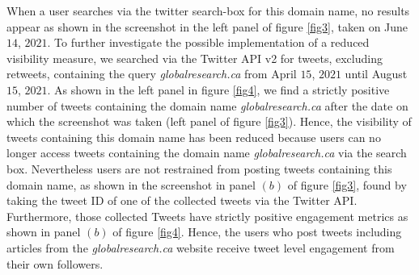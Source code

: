 \documentclass{article}
\begin{document}
When a user searches via the twitter search-box for this domain name, no results appear as shown in the screenshot in the left panel of figure \ref{fig3}, taken on June $14$, $2021$. To further investigate the possible implementation of a reduced visibility measure, we searched via the Twitter API v2 for tweets, excluding retweets, containing the query {\it globalresearch.ca} from April $15$, $2021$ until August $15$, $2021$.  As shown in the left panel in figure \ref{fig4}, we find a strictly positive number of tweets containing the domain name {\it globalresearch.ca} after the date on which the screenshot was taken (left panel of figure \ref{fig3}). Hence, the visibility of tweets containing this domain name has been reduced because users can no longer access tweets containing the domain name {\it globalresearch.ca} via the search box. Nevertheless users are not restrained from posting tweets containing this domain name, as shown in the screenshot in panel $(b)$ of figure \ref{fig3}, found by taking the tweet ID of one of the collected tweets via the Twitter API. Furthermore, those collected Tweets have strictly positive engagement metrics as shown in panel $(b)$ of figure \ref{fig4}. Hence, the users who post tweets including articles from the {\it globalresearch.ca} website receive tweet level engagement from their own followers. 
\end{document}
